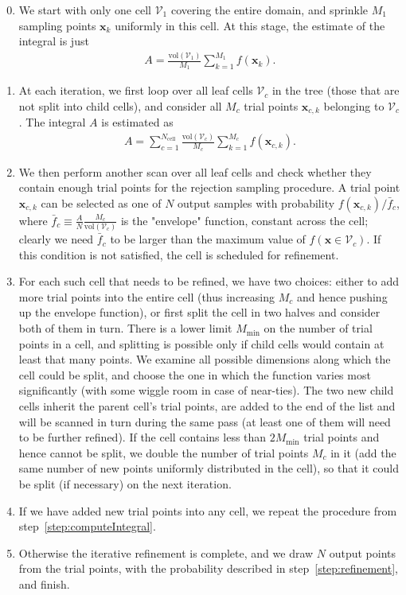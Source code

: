 \documentclass[12pt]{article}
\newcommand{\bx}{\boldsymbol{x}}
\begin{document}
\begin{enumerate}  \setcounter{enumi}{-1} \setlength{\parskip}{2pt} \setlength{\itemsep}{2pt}
\item We start with only one cell $\mathcal{V}_1$ covering the entire domain, and sprinkle $M_1$ sampling points $\bx_k$ uniformly in this cell. At this stage, the estimate of the integral is just
\begin{align}
A = \frac{\mathrm{vol}(\mathcal{V}_1)}{M_1} \sum_{k=1}^{M_1} f(\bx_k).
\end{align}
\item \label{step:computeIntegral}
At each iteration, we first loop over all leaf cells $\mathcal{V}_c$ in the tree (those that are not split into child cells), and consider all $M_c$ trial points $\bx_{c,k}$ belonging to $\mathcal{V}_c$. The integral $A$ is estimated as \begin{align}
A = \sum_{c=1}^{N_\mathrm{cell}} \frac{\mathrm{vol}(\mathcal{V}_c)}{M_c} \sum_{k=1}^{M_c} f(\bx_{c,k}).
\end{align}
\item \label{step:refinement} We then perform another scan over all leaf cells and check whether they contain enough trial points for the rejection sampling procedure. A trial point $\bx_{c,k}$ can be selected as one of $N$ output samples with probability $f(\bx_{c,k}) / \bar f_c$, where $\bar f_c \equiv \frac{A}{N} \frac{M_c}{\mathrm{vol}(\mathcal{V}_c)}$ is the "envelope" function, constant across the cell; clearly we need $\bar f_c$ to be larger than the maximum value of $f(\bx\in\mathcal{V}_c)$. If this condition is not satisfied, the cell is scheduled for refinement.
\item For each such cell that needs to be refined, we have two choices: either to add more trial points into the entire cell (thus increasing $M_c$ and hence pushing up the envelope function), or first split the cell in two halves and consider both of them in turn. There is a lower limit $M_\mathrm{min}$ on the number of trial points in a cell, and splitting is possible only if child cells would contain at least that many points. We examine all possible dimensions along which the cell could be split, and choose the one in which the function varies most significantly (with some wiggle room in case of near-ties). The two new child cells inherit the parent cell's trial points, are added to the end of the list and will be scanned in turn during the same pass (at least one of them will need to be further refined). If the cell contains less than $2M_\mathrm{min}$ trial points and hence cannot be split, we double the number of trial points $M_c$ in it (add the same number of new points uniformly distributed in the cell), so that it could be split (if necessary) on the next iteration.
\item If we have added new trial points into any cell, we repeat the procedure from step~\ref{step:computeIntegral}. 
\item Otherwise the iterative refinement is complete, and we draw $N$ output points from the trial points, with the probability described in step~\ref{step:refinement}, and finish.
\end{enumerate}
\end{document}
